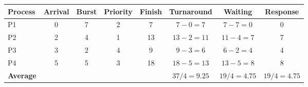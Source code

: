 \begin{tabular}{@{}lccccccc@{}}
\toprule
\textbf{Process} & \textbf{Arrival} & \textbf{Burst} & \textbf{Priority} & \textbf{Finish} & \textbf{Turnaround} & \textbf{Waiting} & \textbf{Response}\\
\midrule
P1 & 0 & 7 & 2 & 7 & $7-0=7$ & $7-7=0$ & 0\\
P2 & 2 & 4 & 1 & 13 & $13-2=11$ & $11-4=7$ & 7\\
P3 & 3 & 2 & 4 & 9 & $9-3=6$ & $6-2=4$ & 4\\
P4 & 5 & 5 & 3 & 18 & $18-5=13$ & $13-5=8$ & 8\\
\midrule
\textbf{Average} &  &  &  &  & $37/4=9.25$ & $19/4=4.75$ & $19/4=4.75$\\
\bottomrule
\end{tabular}
